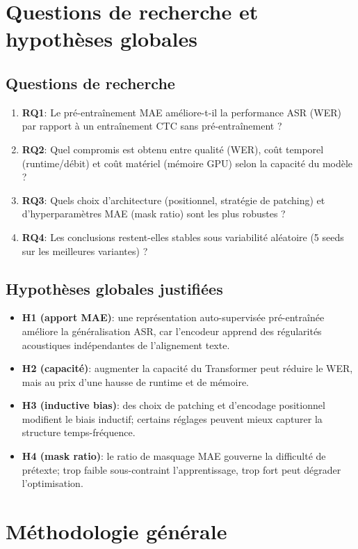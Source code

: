 \documentclass[11pt,a4paper]{article}
\begin{document}
\section{Questions de recherche et hypothèses globales}
\subsection{Questions de recherche}
\begin{enumerate}
\item \textbf{RQ1}: Le pré-entraînement MAE améliore-t-il la performance ASR (WER) par rapport à un entraînement CTC sans pré-entraînement ?
\item \textbf{RQ2}: Quel compromis est obtenu entre qualité (WER), coût temporel (runtime/débit) et coût matériel (mémoire GPU) selon la capacité du modèle ?
\item \textbf{RQ3}: Quels choix d'architecture (positionnel, stratégie de patching) et d'hyperparamètres MAE (mask ratio) sont les plus robustes ?
\item \textbf{RQ4}: Les conclusions restent-elles stables sous variabilité aléatoire (5 seeds sur les meilleures variantes) ?
\end{enumerate}

\subsection{Hypothèses globales justifiées}
\begin{itemize}
\item \textbf{H1 (apport MAE)}: une représentation auto-supervisée pré-entraînée améliore la généralisation ASR, car l'encodeur apprend des régularités acoustiques indépendantes de l'alignement texte.
\item \textbf{H2 (capacité)}: augmenter la capacité du Transformer peut réduire le WER, mais au prix d'une hausse de runtime et de mémoire.
\item \textbf{H3 (inductive bias)}: des choix de patching et d'encodage positionnel modifient le biais inductif; certains réglages peuvent mieux capturer la structure temps-fréquence.
\item \textbf{H4 (mask ratio)}: le ratio de masquage MAE gouverne la difficulté de prétexte; trop faible sous-contraint l'apprentissage, trop fort peut dégrader l'optimisation.
\end{itemize}


\section{Méthodologie générale}
\end{document}

